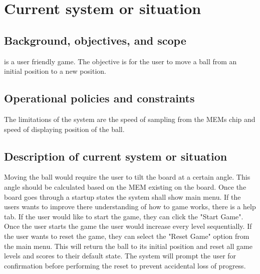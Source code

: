 
\chapter{Current system or situation}
\label{loc:Current System or Situation}
% 

\section{Background, objectives, and scope}
\label{loc:Background, Objectives, and Scope}
% 

\ThisSystem is a user friendly game. The objective is for the user to move a ball from an initial position to a new position. 

\section{Operational policies and constraints}
\label{loc:Operational Policies and Constraints}
% 

The limitations of the system are the speed of sampling from the MEMs chip and speed of displaying position of the ball.


\section{Description of current system or situation}
\label{loc:Description of current system or situation}
% 

Moving the ball would require the user to tilt the board at a certain angle. This angle should be calculated based on the MEM existing on the board.
Once the board goes through a startup states the system shall show main menu. If the users wants to improve there understanding of how to game works, there is a help tab.
If the user would like to start the game, they can click the "Start Game". Once the user starts the game the user would increase every level sequentially.
If the user wants to reset the game, they can select the "Reset Game" option from the main menu. This will return the ball to its initial position and reset all game levels and scores to their default state. The system will prompt the user for confirmation before performing the reset to prevent accidental loss of progress.


